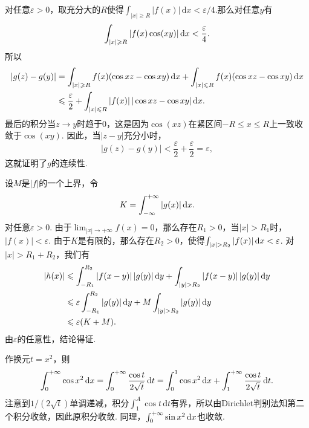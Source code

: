 \begin{ans}
  对任意$\varepsilon>0$，取充分大的$R$使得$\int_{|x|\ge R}|f(x)|\,\mathrm dx<\varepsilon/4$.那么对任意$y$有
  \[
    \int_{|x|\geqslant R}|f(x)\cos(xy)|\,\mathrm dx<\frac\varepsilon4.
  \]
  所以
  \begin{align*}
    |g(z)-g(y)| & = \int_{|x|\geqslant R}f(x)(\cos xz-\cos xy)\,\mathrm dx+\int_{|x|\leqslant R}f(x)(\cos xz-\cos xy)\,\mathrm dx\\
    & \leqslant \frac\varepsilon2 +
    \int_{|x|\leqslant R}|f(x)|\,|\cos xz-\cos xy|\,\mathrm dx.
  \end{align*}
  最后的积分当$z\to y$时趋于0，这是因为$\cos(xz)$在紧区间$-R\le x\le R$上一致收敛于$\cos(xy)$. 因此，当$|z-y|$充分小时，
  \[ |g(z)-g(y)|<\frac\varepsilon2+\frac\varepsilon2=\varepsilon, \]
  这就证明了$g$的连续性.
\end{ans}

\begin{ans}
  设$M$是$|f|$的一个上界，令
  \[ K=\int_{-\infty}^{+\infty}|g(x)|\,\mathrm dx. \]
  对任意$\varepsilon>0$. 由于$\lim_{|x|\to+\infty}f(x)=0$，那么存在$R_1>0$，当$|x|>R_1$时，$|f(x)|<\varepsilon$. 由于$K$是有限的，那么存在$R_2>0$，使得$\int_{|x|>R_2}|f(x)|\,\dx<\varepsilon$. 对$|x|>R_1+R_2$，我们有
  \begin{align*}
    |h(x)| & \le \int_{-R_1}^{R_2}|f(x-y)|\,|g(y)|\,\dy +
       \int_{|y|>R_2} |f(x-y)|\,|g(y)|\,\dy\\
       & \le \varepsilon\int_{-R_1}^{R_2}|g(y)|\,\dy +
       M\int_{|y|>R_2}|g(y)|\,\dy\\
       & \le \varepsilon(K+M).
  \end{align*}
  由$\varepsilon$的任意性，结论得证.
\end{ans}

\begin{ans}
  作换元$t=x^2$，则
  \[ \int_0^{+\infty}\cos x^2\,\mathrm dx =
  \int_0^{+\infty}\frac{\cos t}{2\sqrt t}\,\mathrm dt
  =\int_0^1\cos x^2\,\mathrm dx +
  \int_1^{+\infty}\frac{\cos t}{2\sqrt t}\,\mathrm dt.
   \]
  注意到$1/(2\sqrt t)$单调递减，积分$\int_1^A\cos t\,\mathrm dt$有界，所以由Dirichlet判别法知第二个积分收敛，因此原积分收敛. 同理，$\int_0^{+\infty}\sin x^2\,\mathrm dx$也收敛.
\end{ans}

